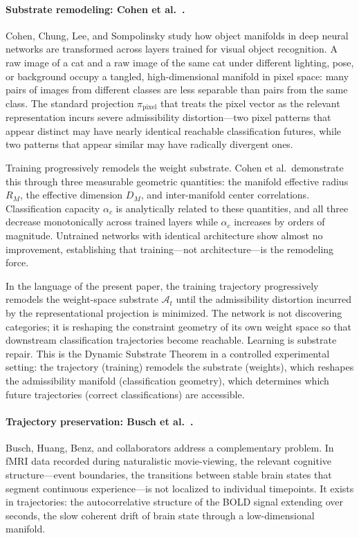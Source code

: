 \documentclass[12pt,a4paper]{article}
\begin{document}
\paragraph{Substrate remodeling: Cohen et al.~\cite{cohen2020}.}
Cohen, Chung, Lee, and Sompolinsky study how object manifolds in deep neural networks are transformed across layers trained for visual object recognition. A raw image of a cat and a raw image of the same cat under different lighting, pose, or background occupy a tangled, high-dimensional manifold in pixel space: many pairs of images from different classes are less separable than pairs from the same class. The standard projection $\pi_{\text{pixel}}$ that treats the pixel vector as the relevant representation incurs severe admissibility distortion---two pixel patterns that appear distinct may have nearly identical reachable classification futures, while two patterns that appear similar may have radically divergent ones.

Training progressively remodels the weight substrate. Cohen et al.\ demonstrate this through three measurable geometric quantities: the manifold effective radius $R_M$, the effective dimension $D_M$, and inter-manifold center correlations. Classification capacity $\alpha_c$ is analytically related to these quantities, and all three decrease monotonically across trained layers while $\alpha_c$ increases by orders of magnitude. Untrained networks with identical architecture show almost no improvement, establishing that training---not architecture---is the remodeling force.

In the language of the present paper, the training trajectory progressively remodels the weight-space substrate $\mathcal{A}_t$ until the admissibility distortion incurred by the representational projection is minimized. The network is not discovering categories; it is reshaping the constraint geometry of its own weight space so that downstream classification trajectories become reachable. Learning is substrate repair. This is the Dynamic Substrate Theorem in a controlled experimental setting: the trajectory (training) remodels the substrate (weights), which reshapes the admissibility manifold (classification geometry), which determines which future trajectories (correct classifications) are accessible.

\paragraph{Trajectory preservation: Busch et al.~\cite{busch2022}.}
Busch, Huang, Benz, and collaborators address a complementary problem. In fMRI data recorded during naturalistic movie-viewing, the relevant cognitive structure---event boundaries, the transitions between stable brain states that segment continuous experience---is not localized to individual timepoints. It exists in trajectories: the autocorrelative structure of the BOLD signal extending over seconds, the slow coherent drift of brain state through a low-dimensional manifold.
\end{document}
